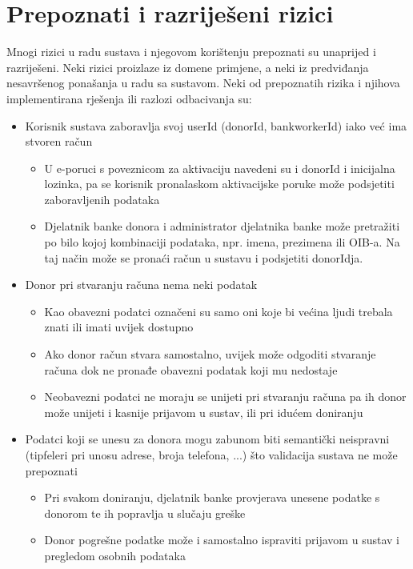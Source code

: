         \section{Prepoznati i razriješeni rizici}
            \par{
            Mnogi rizici u radu sustava i njegovom korištenju prepoznati su unaprijed i razriješeni. Neki rizici proizlaze iz domene primjene, a neki iz predviđanja nesavršenog ponašanja u radu sa sustavom. Neki od prepoznatih rizika i njihova implementirana rješenja ili razlozi odbacivanja su:
            }
            \begin{itemize}
                \item Korisnik sustava zaboravlja svoj userId (donorId, bankworkerId) iako već ima stvoren račun
                \begin{itemize}
                    \item U e-poruci s poveznicom za aktivaciju navedeni su i donorId i inicijalna lozinka, pa se korisnik pronalaskom aktivacijske poruke može podsjetiti zaboravljenih podataka
                    \item Djelatnik banke donora i administrator djelatnika banke može pretražiti po bilo kojoj kombinaciji podataka, npr. imena, prezimena ili OIB-a. Na taj način može se pronaći račun u sustavu i podsjetiti donorIdja.
                \end{itemize}
                
                \item Donor pri stvaranju računa nema neki podatak
                \begin{itemize}
                    \item Kao obavezni podatci označeni su samo oni koje bi većina ljudi trebala znati ili imati uvijek dostupno
                    \item Ako donor račun stvara samostalno, uvijek može odgoditi stvaranje računa dok ne pronađe obavezni podatak koji mu nedostaje
                    \item Neobavezni podatci ne moraju se unijeti pri stvaranju računa pa ih donor može unijeti i kasnije prijavom u sustav, ili pri idućem doniranju
                \end{itemize}
                
                \item Podatci koji se unesu za donora mogu zabunom biti semantički neispravni (tipfeleri pri unosu adrese, broja telefona, ...) što validacija sustava ne može prepoznati
                \begin{itemize}
                    \item Pri svakom doniranju, djelatnik banke provjerava unesene podatke s donorom te ih popravlja u slučaju greške
                    \item Donor pogrešne podatke može i samostalno ispraviti prijavom u sustav i pregledom osobnih podataka
                \end{itemize}
                

\end{itemize}
